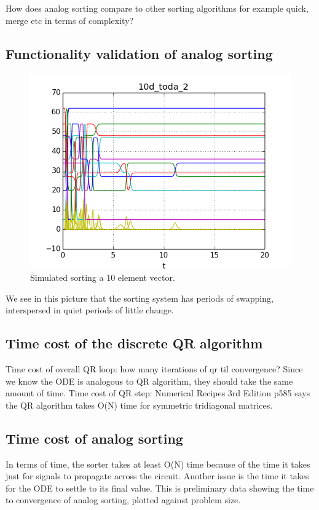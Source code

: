How does analog sorting compare to other sorting algorithms for example quick, merge etc in terms of complexity?

\subsection{Functionality validation of analog sorting}
\begin{figure}
\centering
\includegraphics[width=\columnwidth]{../pyscripts/Graphs/10d_toda_2.png}
\caption{Simulated sorting a 10 element vector.}
\end{figure}

We see in this picture that the sorting system has periods of swapping, interspersed in quiet periods of little change.

\subsection{Time cost of the discrete QR algorithm}
Time cost of overall QR loop:
	how many iterations of qr til convergence?
	Since we know the ODE is analogous to QR algorithm, they should take the same amount of time.
Time cost of QR step:
	Numerical Recipes 3rd Edition p585 says the QR algorithm takes O(N) time for symmetric tridiagonal matrices.

\subsection{Time cost of analog sorting}

In terms of time, the sorter takes at least O(N) time because of the time it takes just for signals to propagate across the circuit.
Another issue is the time it takes for the ODE to settle to its final value.
This is preliminary data showing the time to convergence of analog sorting, plotted against problem size.

